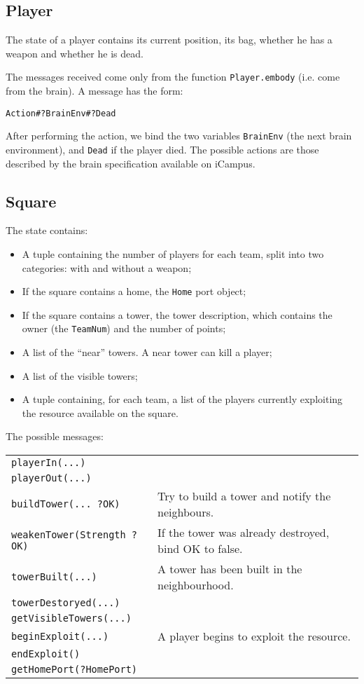 \subsection{Player}
The state of a player contains its current position, its bag, whether he has a weapon and whether he is dead.

The messages received come only from the function \texttt{Player.embody} (i.e. come from the brain). A message has the form:

\begin{center}
\texttt{Action\#?BrainEnv\#?Dead}
\end{center}

After performing the action, we bind the two variables \texttt{BrainEnv} (the next brain environment), and \texttt{Dead} if the player died. The possible actions are those described by the brain specification available on iCampus.

\subsection{Square}
The state contains:
\begin{itemize}
  \item A tuple containing the number of players for each team, split into two categories: with and without a weapon;
  \item If the square contains a home, the \texttt{Home} port object;
  \item If the square contains a tower, the tower description, which contains the owner (the \texttt{TeamNum}) and the number of points;
  \item A list of the \textquotedblleft{}near\textquotedblright{} towers. A near tower can kill a player;
  \item A list of the visible towers;
  \item A tuple containing, for each team, a list of the players currently exploiting the resource available on the square.
\end{itemize}

\bigskip
The possible messages:

\bigskip
\begin{tabular}{ll}
  \texttt{playerIn(...)} & \\
  \texttt{playerOut(...)} & \\
  \texttt{buildTower(... ?OK)} & Try to build a tower and notify the neighbours.\\
  \texttt{weakenTower(Strength ?OK)} & If the tower was already destroyed, bind OK to false.\\
  \texttt{towerBuilt(...)} & A tower has been built in the neighbourhood.\\
  \texttt{towerDestoryed(...)} & \\
  \texttt{getVisibleTowers(...)} & \\
  \texttt{beginExploit(...)} & A player begins to exploit the resource.\\
  \texttt{endExploit()} & \\
  \texttt{getHomePort(?HomePort)} &
\end{tabular}

